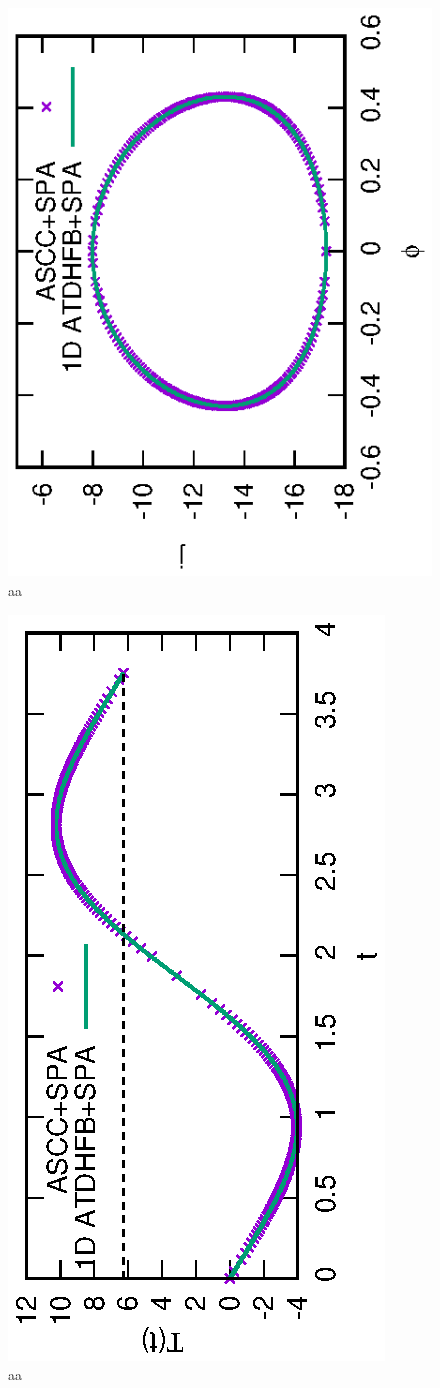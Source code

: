 \documentclass[%
superscriptaddress,
showpacs,
nofootinbib,
amsmath,amssymb,
aps,
prc,
twocolumn,
floatfix ]%
{revtex4-1}
\begin{document}
\begin{figure}[thb]
 \begin{center}
   \includegraphics[height=0.5\textwidth,angle=-90]{N100Xeq2trajectory.eps}
 \end{center}
\caption{aa}
\label{fig:N100_traj}
\end{figure}
\begin{figure}[thb]
 \begin{center}
   \includegraphics[height=0.5\textwidth,angle=-90]{N100Xeq2tau.eps}
 \end{center}
\caption{aa}
\label{fig:N100_tau}
\end{figure}
\end{document}
